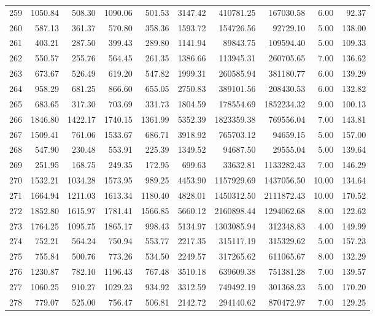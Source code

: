 \begin{tabular}{lrrrrrrrrr}
259 & 1050.84 & 508.30 & 1090.06 & 501.53 & 3147.42 & 410781.25 & 167030.58 & 6.00 & 92.37 \\
260 & 587.13 & 361.37 & 570.80 & 358.36 & 1593.72 & 154726.56 & 92729.10 & 5.00 & 138.00 \\
261 & 403.21 & 287.50 & 399.43 & 289.80 & 1141.94 & 89843.75 & 109594.40 & 5.00 & 109.33 \\
262 & 550.57 & 255.76 & 564.45 & 261.35 & 1386.66 & 113945.31 & 260705.65 & 7.00 & 136.62 \\
263 & 673.67 & 526.49 & 619.20 & 547.82 & 1999.31 & 260585.94 & 381180.77 & 6.00 & 139.29 \\
264 & 958.29 & 681.25 & 866.60 & 655.05 & 2750.83 & 389101.56 & 208430.53 & 6.00 & 132.82 \\
265 & 683.65 & 317.30 & 703.69 & 331.73 & 1804.59 & 178554.69 & 1852234.32 & 9.00 & 100.13 \\
266 & 1846.80 & 1422.17 & 1740.15 & 1361.99 & 5352.39 & 1823359.38 & 769556.04 & 7.00 & 143.81 \\
267 & 1509.41 & 761.06 & 1533.67 & 686.71 & 3918.92 & 765703.12 & 94659.15 & 5.00 & 157.00 \\
268 & 547.90 & 230.48 & 553.91 & 225.39 & 1349.52 & 94687.50 & 29555.04 & 5.00 & 139.64 \\
269 & 251.95 & 168.75 & 249.35 & 172.95 & 699.63 & 33632.81 & 1133282.43 & 7.00 & 146.29 \\
270 & 1532.21 & 1034.28 & 1573.95 & 989.25 & 4453.90 & 1157929.69 & 1437056.50 & 10.00 & 134.64 \\
271 & 1664.94 & 1211.03 & 1613.34 & 1180.40 & 4828.01 & 1450312.50 & 2111872.43 & 10.00 & 170.52 \\
272 & 1852.80 & 1615.97 & 1781.41 & 1566.85 & 5660.12 & 2160898.44 & 1294062.68 & 8.00 & 122.62 \\
273 & 1764.25 & 1095.75 & 1865.17 & 998.43 & 5134.97 & 1303085.94 & 312348.83 & 4.00 & 149.99 \\
274 & 752.21 & 564.24 & 750.94 & 553.77 & 2217.35 & 315117.19 & 315329.62 & 5.00 & 157.23 \\
275 & 755.84 & 500.76 & 773.26 & 534.50 & 2249.57 & 317265.62 & 611065.67 & 8.00 & 132.29 \\
276 & 1230.87 & 782.10 & 1196.43 & 767.48 & 3510.18 & 639609.38 & 751381.28 & 7.00 & 139.57 \\
277 & 1060.25 & 910.27 & 1029.23 & 934.92 & 3312.59 & 749492.19 & 301368.23 & 5.00 & 170.20 \\
278 & 779.07 & 525.00 & 756.47 & 506.81 & 2142.72 & 294140.62 & 870472.97 & 7.00 & 129.25 \\

\end{tabular}
